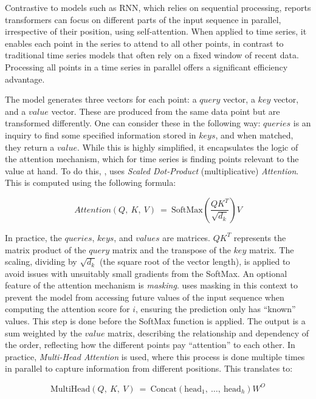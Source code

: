 \documentclass[12pt,a4paper]{article}
\begin{document}
Contrastive to models such as RNN, which relies on sequential processing, \cite{Vaswani2017} reports transformers can focus on different parts of the input sequence in parallel, irrespective of their position, using self-attention. When applied to time series, it enables each point in the series to attend to all other points, in contrast to traditional time series models that often rely on a fixed window of recent data. Processing all points in a time series in parallel offers a significant efficiency advantage.

The model generates three vectors for each point: a $query$ vector, a $key$ vector, and a $value$ vector. These are produced from the same data point but are transformed differently. One can consider these in the following way: $queries$ is an inquiry to find some specified information stored in $keys$, and when matched, they return a $value$. While this is highly simplified, it encapsulates the logic of the attention mechanism, which for time series is finding points relevant to the value at hand. To do this, \cite{Vaswani2017}, uses \textit{Scaled Dot-Product} (multiplicative) \textit{Attention}. This is computed using the following formula:

\begin{equation}
  Attention(Q,\ K,\ V)\ =\ \text{SoftMax}\left(\frac{QK^T}{\sqrt{d_k}}\right)V
  \label{attention}
\end{equation}

In practice, the $queries$, $keys$, and $values$ are matrices. $QK^T$ represents the matrix product of the $query$ matrix and the transpose of the $key$ matrix. The scaling, dividing by $\sqrt{d_k}$ (the square root of the vector length), is applied to avoid issues with unsuitably small gradients from the SoftMax. An optional feature of the attention mechanism is \textit{masking}. \cite{Vaswani2017} uses masking in this context to prevent the model from accessing future values of the input sequence when computing the attention score for $i$, ensuring the prediction only has “known” values. This step is done before the SoftMax function is applied. The output is a sum weighted by the $value$ matrix, describing the relationship and dependency of the order, reflecting how the different points pay “attention” to each other. In practice, \textit{Multi-Head Attention} is used, where this process is done multiple times in parallel to capture information from different positions. This translates to:

\begin{equation}
  \text{MultiHead}(Q,\ K,\ V)\ =\ \text{Concat}\left(\text{head}_1,\ \ldots,\ \text{head}_h\right)W^O
  \label{multihead}
\end{equation}
\end{document}
